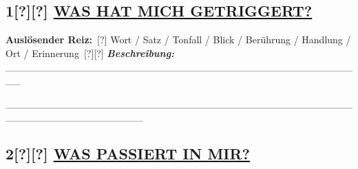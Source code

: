 \hypertarget{section-1}{%
\subsection{}\label{section-1}}

\hypertarget{was-hat-mich-getriggert}{%
\subsection{\texorpdfstring{1[?][?] \textbf{\ul{WAS HAT MICH GETRIGGERT?}}}{1[?][?] WAS HAT MICH GETRIGGERT?}}\label{was-hat-mich-getriggert}}

\textbf{Auslösender Reiz:}\
[?] Wort / Satz / Tonfall / Blick / Berührung / Handlung / Ort / Erinnerung\
[?][?] \emph{\textbf{Beschreibung:}} \_\_\_\_\_\_\_\_\_\_\_\_\_\_\_\_\_\_\_\_\_\_\_\_\_\_\_\_\_\_\_\_\_\_\_\_\_\_\_\_\_\_\_\_\_\_\_\_\_\_

\_\_\_\_\_\_\_\_\_\_\_\_\_\_\_\_\_\_\_\_\_\_\_\_\_\_\_\_\_\_\_\_\_\_\_\_\_\_\_\_\_\_\_\_\_\_\_\_\_\_\_\_\_\_\_\_\_\_\_\_\_\_\_\_\_\_\_

\hypertarget{section-2}{%
\subsection{}\label{section-2}}

\hypertarget{section-3}{%
\subsection{}\label{section-3}}

\hypertarget{was-passiert-in-mir-1}{%
\subsection{\texorpdfstring{2[?][?] \textbf{\ul{WAS PASSIERT IN MIR?}}}{2[?][?] WAS PASSIERT IN MIR?}}\label{was-passiert-in-mir-1}}

